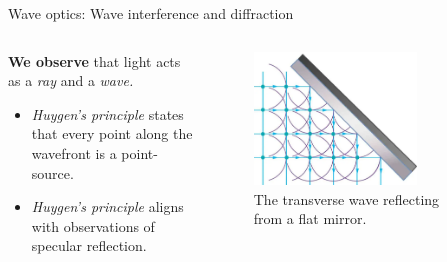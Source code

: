 \documentclass{beamer}
\begin{document}
\begin{frame}{Wave optics: Wave interference and diffraction}
\begin{columns}[T]
\begin{column}{0.5\textwidth}
\small
\textbf{We observe} that light acts as a \textit{ray} and a \textit{wave.}
\begin{itemize}
\item \textit{Huygen's principle} states that every point along the wavefront is a point-source.
\item \textit{Huygen's principle} aligns with observations of specular reflection.
\end{itemize}
\end{column}
\begin{column}{0.5\textwidth}
\begin{figure}
\centering
\includegraphics[width=0.75\textwidth]{figures/wave3.png}
\caption{\label{fig:wave3} \footnotesize The transverse wave reflecting from a flat mirror.}
\end{figure}
\end{column}
\end{columns}
\end{frame}
\end{document}
